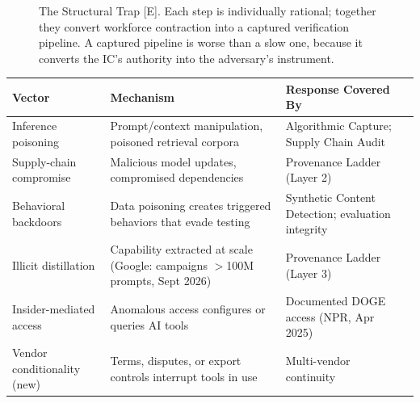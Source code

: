 \documentclass[11pt,letterpaper]{article}
\begin{document}
\begin{figure}[!htbp]
\centering
{}
\caption{The Structural Trap [E]. Each step is individually rational; together they convert workforce contraction into a captured verification pipeline. A captured pipeline is worse than a slow one, because it converts the IC's authority into the adversary's instrument.}
\label{fig:trap}
\end{figure}

\begin{warnbox}
\begin{center}
\scriptsize
\begin{tabularx}{\linewidth}{ZY{0.67}Y{1.29}Y{1.04}}
\toprule
\textbf{Vector} & \textbf{Mechanism} & \textbf{Response Covered By} \\
\midrule
Inference poisoning & Prompt/context manipulation, poisoned retrieval corpora & Algorithmic Capture; Supply Chain Audit \\
Supply-chain compromise & Malicious model updates, compromised dependencies & Provenance Ladder (Layer 2) \\
Behavioral backdoors & Data poisoning creates triggered behaviors that evade testing & Synthetic Content Detection; evaluation integrity \\
Illicit distillation & Capability extracted at scale (Google: campaigns $>$100M prompts, Sept 2026) & Provenance Ladder (Layer 3) \\
Insider-mediated access & Anomalous access configures or queries AI tools & Documented DOGE access (NPR, Apr 2025) \\
Vendor conditionality (new) & Terms, disputes, or export controls interrupt tools in use & Multi-vendor continuity \\
\bottomrule
\end{tabularx}
\end{center}
\end{warnbox}
\end{document}
